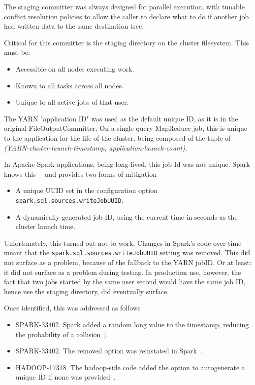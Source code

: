 \documentclass[conference]{IEEEtran}
\begin{document}
The staging committer was always designed for parallel execution,
with tunable conflict resolution policies to allow the caller to
declare what to do if another job had written data to the same
destination tree.

Critical for this committer is the staging directory on the cluster filesystem.
This must be:

\begin{itemize}
    \item Accessible on all nodes executing work.
    \item Known to all tasks across all nodes.
    \item Unique to all active jobs of that user.
\end{itemize}

The YARN "application ID" was used as the default unique ID, as it is in the original
FileOutputCommitter.
On a single-query MapReduce job, this is unique to the application
for the life of the cluster, being composed of the tuple of
\emph{(YARN-cluster-launch-timestamp, application-launch-count)}.

In Apache Spark applications, being long-lived, this job Id was not unique.
Spark knows this ---and provides two forms of mitigation
\begin{itemize}
    \item A unique UUID set in the configuration option \texttt{spark.sql.sources.writeJobUUID}.
    \item A dynamically generated job ID, using the current time in seconds as the cluster launch time.
\end{itemize}

Unfortunately, this turned out not to work.
Changes in Spark's code over time meant that the
\texttt{spark.sql.sources.writeJobUUID} setting was removed.
This did not surface as a problem, because of the fallback to the YARN jobID.
Or at least: it did not surface as a problem during testing.
In production use, however, the fact that two jobs started by the same user
second would have the same job ID, hence use the staging directory,
did eventually surface.

Once identified, this was addressed as follows
\begin{itemize}
    \item SPARK-33402. Spark added a random long value to the timestamp, reducing the probability of a collision\ \cite{SPARK-33402}].
    \item SPARK-33402. The removed option was reinstated in Spark\ \cite{SPARK-33230}.
    \item HADOOP-17318. The hadoop-side code added the option to autogenerate a unique ID if none was provided\ \cite{HADOOP-17318}.
\end{itemize}
\end{document}
